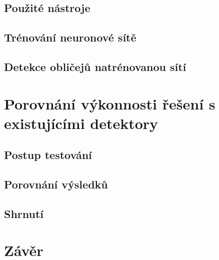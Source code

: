 \section{Použité nástroje}


\section{Trénování neuronové sítě}


\section{Detekce obličejů natrénovanou sítí}




\chapter{Porovnání výkonnosti řešení s existujícími detektory}
\label{kapitola:porovnani_vykonnosti}


\section{Postup testování}


\section{Porovnání výsledků}


\section{Shrnutí}


\chapter{Závěr}
\label{kapitola:zaver}
